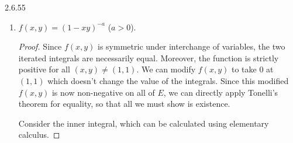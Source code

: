 \documentclass[11pt]{article}
\begin{document}
\begin{problem}{2.6.55}
\begin{enumerate}[label=\alph*.]
\begin{proof}
        It remains to show that we can actually evaluate these iterated integrals.
        Note that the positive and negative parts of \( f \) are just \( f^+ = f \text{ if } x \geq y, 0 \text{ otherwise} \), and vise-versa for \( f^- \).
        Additionally, since \( f(x,y) = -f(y,x) \), we see that the two halves of the ``triangle'' are equal,
        \begin{equation}
        \label{eq:12}
        \int f^+ \dd m^2 = \int f^- \dd m^2.
        \end{equation}
        However, since we already showed that \( f \not\in L_1 \), this means we must have both the positive and negative integrals infinite, and thus \( \int f \dd m^2 \) is undefined.
          \end{proof}
    \item \( f(x,y) = (1-xy)^{-a} \) (\( a > 0 \)).
          \begin{proof}
            Since \( f(x,y) \) is symmetric under interchange of variables, the two iterated integrals are necessarily equal.
            Moreover, the function is strictly positive for all \( (x,y) \neq (1,1) \).
            We can modify \( f(x,y) \) to take \( 0 \) at \( (1,1) \) which doesn't change the value of the integrals.
            Since this modified \( f(x,y) \) is now non-negative on all of \( E \), we can directly apply Tonelli's theorem for equality, so that all we must show is existence.

            Consider the inner integral, which can be calculated using elementary calculus.


\end{proof}
\end{enumerate}
\end{problem}
\end{document}
